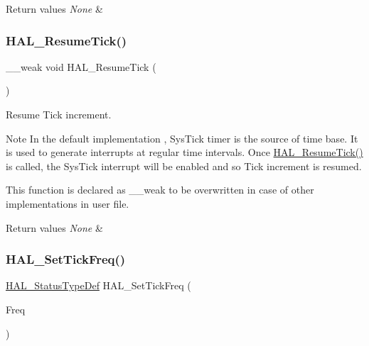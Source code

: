 \begin{DoxyRetVals}{Return values}
{\em None} & \\
\hline
\end{DoxyRetVals}
\mbox{\label{group___h_a_l___exported___functions___group2_gac3fa17aa85e357e3f1af56ad110d2e97}} 
\subsubsection{\texorpdfstring{H\+A\+L\+\_\+\+Resume\+Tick()}{HAL\_ResumeTick()}}
{\footnotesize\ttfamily \+\_\+\+\_\+weak void H\+A\+L\+\_\+\+Resume\+Tick (\begin{DoxyParamCaption}\item[{void}]{ }\end{DoxyParamCaption})}



Resume Tick increment. 

\begin{DoxyNote}{Note}
In the default implementation , Sys\+Tick timer is the source of time base. It is used to generate interrupts at regular time intervals. Once \mbox{\hyperlink{group___h_a_l___exported___functions___group2_gac3fa17aa85e357e3f1af56ad110d2e97}{H\+A\+L\+\_\+\+Resume\+Tick()}} is called, the Sys\+Tick interrupt will be enabled and so Tick increment is resumed. 

This function is declared as \+\_\+\+\_\+weak to be overwritten in case of other implementations in user file. 
\end{DoxyNote}

\begin{DoxyRetVals}{Return values}
{\em None} & \\
\hline
\end{DoxyRetVals}
\mbox{\label{group___h_a_l___exported___functions___group2_ga47f2dd240b2aed823a76b11496f37690}} 
\subsubsection{\texorpdfstring{H\+A\+L\+\_\+\+Set\+Tick\+Freq()}{HAL\_SetTickFreq()}}
{\footnotesize\ttfamily \mbox{\hyperlink{stm32f4xx__hal__def_8h_a63c0679d1cb8b8c684fbb0632743478f}{H\+A\+L\+\_\+\+Status\+Type\+Def}} H\+A\+L\+\_\+\+Set\+Tick\+Freq (\begin{DoxyParamCaption}\item[{H\+A\+L\+\_\+\+Tick\+Freq\+Type\+Def}]{Freq }\end{DoxyParamCaption})}



